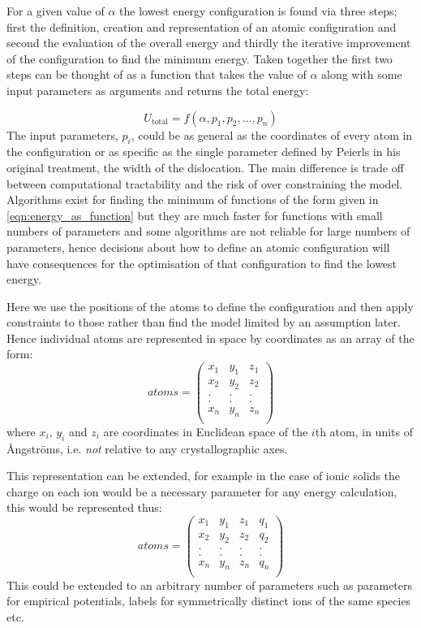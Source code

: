 For a given value of $\alpha$ the lowest energy configuration is found via three steps; first the definition, creation and representation of an atomic configuration and second the evaluation of the overall energy and thirdly the iterative improvement of the configuration to find the minimum energy. Taken together the first two steps can be thought of as a function that takes the value of $\alpha$ along with some input parameters as arguments and returns the total energy:

\begin{equation}
U_{\text{total}} = f(\alpha, p_1, p_2,...,p_n )
\label{eqn:energy_as_function}
\end{equation}
The input parameters, $p_i$, could be as general as the coordinates of every atom in the configuration or as specific as the single parameter defined by Peierls in his original treatment, the width of the dislocation. The main difference is trade off between computational tractability and the risk of over constraining the model. Algorithms exist for finding the minimum of functions of the form given in \autoref{eqn:energy_as_function} but they are much faster for functions with small numbers of parameters and some algorithms are not reliable for large numbers of parameters, hence decisions about how to define an atomic configuration will have consequences for the optimisation of that configuration to find the lowest energy.

Here we use the positions of the atoms to define the configuration and then apply constraints to those rather than find the model limited by an assumption later. Hence individual atoms are represented in space by coordinates as an array of the form:
$$ atoms = \begin{pmatrix}
x_1 & y_1 & z_1  \\
x_2 & y_2 & z_2  \\
.   &.    &.     \\
.   &.    &.     \\
x_n & y_n & z_n  \\
\end{pmatrix}
$$
where $x_i$, $y_i$ and $z_i$ are coordinates in Euclidean space of the $i$th atom, in units of \r{A}ngstr\"{o}ms, i.e. \emph{not} relative to any crystallographic axes.

This representation can be extended, for example in the case of ionic solids the charge on each ion would be a necessary parameter for any energy calculation, this would be represented thus:
$$
atoms = \begin{pmatrix}
x_1 & y_1 & z_1 & q_1 \\
x_2 & y_2 & z_2 & q_2 \\
.   &.    &.    &.    \\
.   &.    &.    &.    \\
x_n & y_n & z_n & q_n \\
\end{pmatrix}
$$
This could be extended to an arbitrary number of parameters such as parameters for empirical potentials, labels for symmetrically distinct ions of the same species etc.





